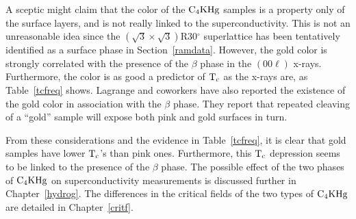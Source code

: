         A sceptic might claim that the color of the $\rm C_4KHg$ samples is
a  property only of  the surface layers,  and is not  really  linked to the
superconductivity.  This  is not an unreasonable  idea since the $(\sqrt{3}
\times \sqrt{3})$R30$^{\circ}$ superlattice has been tentatively identified
as a  surface phase  in Section~\ref{ramdata}.  However,  the gold color is
strongly correlated with   the  presence of   the  $\beta$ phase    in  the
$(00\ell)$ x-rays.  Furthermore, the color is as  good  a predictor of $\rm
T_c$    as  the x-rays   are,   as Table~\ref{tcfreq}  shows.  Lagrange and
coworkers have also reported the existence of the gold color in association
with the $\beta$ phase.\cite{lagrange83} They report that repeated cleaving
of a ``gold'' sample will expose both pink and gold surfaces in turn.

        From these considerations  and the evidence  in Table~\ref{tcfreq},
it is  clear that gold  samples  have lower  $\rm   T_c$'s than pink  ones.
Furthermore, this $\rm T_c$ depression seems to  be linked  to the presence
of  the $\beta$ phase.   The possible  effect  of  the   two phases of $\rm
C_4KHg$   on  superconductivity   measurements  is   discussed  further  in
Chapter~\ref{hydrog}.  The differences in  the critical  fields of the  two
types of $\rm C_4KHg$ are detailed in Chapter~\ref{critf}.


